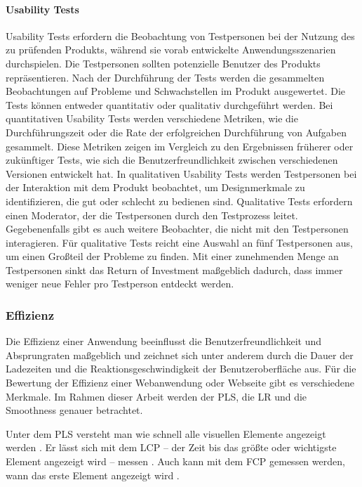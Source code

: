 \paragraph{Usability Tests}
Usability Tests erfordern die Beobachtung von Testpersonen bei der Nutzung des zu prüfenden Produkts, während sie vorab entwickelte Anwendungsszenarien durchspielen. Die Testpersonen sollten potenzielle Benutzer des Produkts repräsentieren.\cite[S.~22]{Dumas.1999} Nach der Durchführung der Tests werden die gesammelten Beobachtungen auf Probleme und Schwachstellen im Produkt ausgewertet. Die Tests können entweder quantitativ oder qualitativ durchgeführt werden. Bei quantitativen Usability Tests werden verschiedene Metriken, wie die Durchführungszeit oder die Rate der erfolgreichen Durchführung von Aufgaben gesammelt. Diese Metriken zeigen im Vergleich zu den Ergebnissen früherer oder zukünftiger Tests, wie sich die Benutzerfreundlichkeit zwischen verschiedenen Versionen entwickelt hat. In qualitativen Usability Tests werden Testpersonen bei der Interaktion mit dem Produkt beobachtet, um Designmerkmale zu identifizieren, die gut oder schlecht zu bedienen sind.\cite{Budiu.2017} Qualitative Tests erfordern einen Moderator, der die Testpersonen durch den Testprozess leitet. Gegebenenfalls gibt es auch weitere Beobachter, die nicht mit den Testpersonen interagieren.\cite{Moran.2019} Für qualitative Tests reicht eine Auswahl an fünf Testpersonen aus, um einen Großteil der Probleme zu finden. Mit einer zunehmenden Menge an Testpersonen sinkt das Return of Investment maßgeblich dadurch, dass immer weniger neue Fehler pro Testperson entdeckt werden.\cite{Nielsen.2012}

\subsubsection{Effizienz}\label{sec:PerformanceBasics}
Die Effizienz einer Anwendung beeinflusst die Benutzerfreundlichkeit und Absprungraten maßgeblich und zeichnet sich unter anderem durch die Dauer der Ladezeiten und die Reaktionsgeschwindigkeit der Benutzeroberfläche aus. Für die Bewertung der Effizienz einer Webanwendung oder Webseite gibt es verschiedene Merkmale. Im Rahmen dieser Arbeit werden der \ac{PLS}, die \ac{LR} und die Smoothness genauer betrachtet. 

Unter dem \ac{PLS} versteht man wie schnell alle visuellen Elemente angezeigt werden \cite{PerformanceMetrics}. Er lässt sich mit dem \ac{LCP} – der Zeit bis das größte oder wichtigste Element angezeigt wird – messen \cite{LCP}. Auch kann mit dem \ac{FCP} gemessen werden, wann das erste Element angezeigt wird \cite{FCP}.

